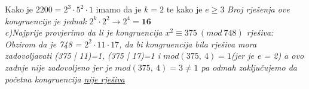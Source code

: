 \documentclass[12pt]{article}
\begin{document}
\begin{enumerate}
\begin{center}
{          Kako je $2200 = 2^3\cdot5^2\cdot1$ imamo da je $\textbf{$k = 2$}$ te kako je $\textbf{$e \geq 3$}$}
                    \textit{Broj rješenja ove kongruencije je jednak $2^k\cdot2^2 \rightarrow 2^4 = \textbf{16}$}\\
                       \vspace*{0.75cm}
                       \textit{c)Najprije provjerimo da li je kongruencija $x^2\equiv 375\ (mod\ 748)$ rješiva:\\Obzirom da je 748 = $2^2\cdot11\cdot17$, da bi kongruencija bila rješiva mora zadovoljavati (375 | 11)=1, (375 | 17)=1 i $mod(375,\ 4)=1$(jer je e = 2) a ovo zadnje nije zadovoljeno jer je $mod(375,\ 4)=3 \neq 1$ pa odmah zaključujemo da početna kongruencija \underline{nije rješiva}\\}
                       \vspace{0.75cm}
                        

\end{center}
\end{enumerate}
\end{document}
